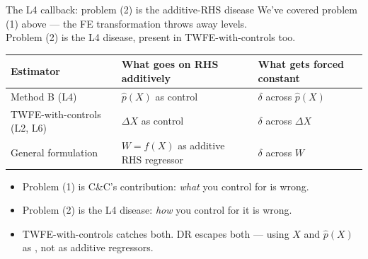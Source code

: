 \documentclass[aspectratio=169,11pt]{beamer}
\begin{document}
\begin{frame}{The L4 callback: problem (2) is the additive-RHS disease}
\vspace{0.3em}
We've covered problem (1) above --- the FE transformation throws away levels. \\
Problem (2) is the L4 disease, present in TWFE-with-controls too.
\vspace{0.4em}
\begin{center}
\renewcommand{\arraystretch}{1.4}
\footnotesize
\begin{tabular}{@{}lll@{}}
\toprule
\textbf{Estimator} & \textbf{What goes on RHS additively} & \textbf{What gets forced constant} \\
\midrule
\rowcolor{remixgreenlight}
Method B (L4)             & $\widehat{p}(X)$ as control          & $\delta$ across $\widehat{p}(X)$ \\
\rowcolor{remixgreenlight}
TWFE-with-controls (L2, L6) & $\Delta X$ as control              & $\delta$ across $\Delta X$       \\
\rowcolor{remixgreenlight}
General formulation       & $W = f(X)$ as additive RHS regressor & $\delta$ across $W$              \\
\bottomrule
\end{tabular}
\end{center}
\vspace{0.3em}
\begin{itemize}\small
  \item Problem (1) is C\&C's contribution: \textit{what} you control for is wrong.
  \item Problem (2) is the L4 disease: \textit{how} you control for it is wrong.
  \item TWFE-with-controls catches both. DR escapes both --- using $X$ and $\widehat{p}(X)$ as , not as additive regressors.
\end{itemize}
\end{frame}
\end{document}
